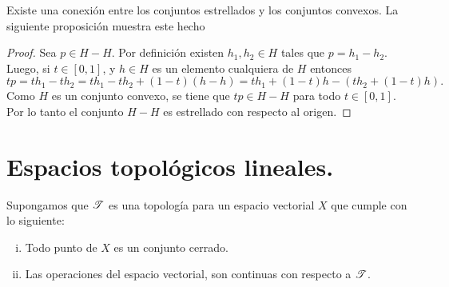 Existe una conexión entre los conjuntos estrellados y los conjuntos 
convexos. La siguiente proposición muestra este hecho
\begin{proof}
Sea $p\in H-H$. Por definición existen $h_1,h_2\in H$ tales que 
$p=h_1-h_2$. Luego, si $t\in[0,1]$, y $h\in H$ es un elemento cualquiera
de $H$ entonces 
$$
tp = th_1-th_2= th_1-th_2+(1-t)(h-h)=th_1+(1-t)h-(th_2+(1-t)h).
$$ 
Como $H$ es un conjunto
convexo, se tiene que $tp\in H-H$ para todo $t\in[0,1]$. Por lo tanto
el conjunto $H-H$ es estrellado con respecto al origen.
\end{proof}




\section{Espacios topológicos lineales.}
\setcounter{theorem}{0}

Supongamos que $\mathscr{T}$ es una topología para un espacio vectorial $X$
que cumple con lo siguiente:
\begin{enumerate}[i.]
	\item Todo punto de $X$ es un conjunto cerrado.
	\item Las operaciones del espacio vectorial, son continuas 
	con respecto a $\mathscr{T}$.
\end{enumerate}

